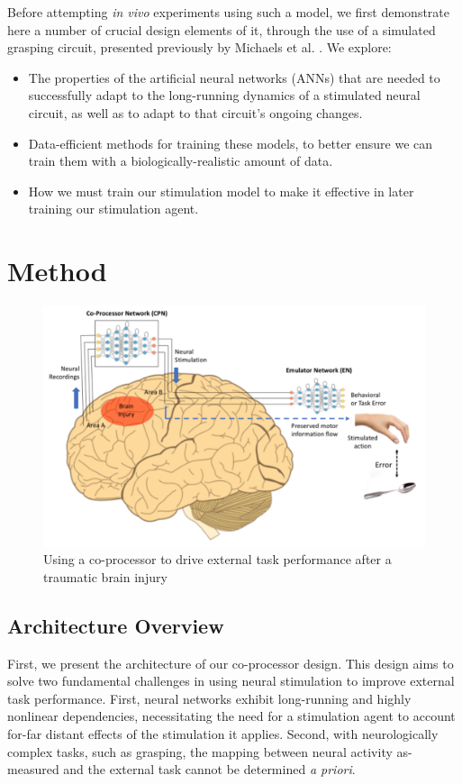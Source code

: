 \documentclass[12pt]{iopart}
\begin{document}
Before attempting \textit{in vivo} experiments using such a model, we first demonstrate
here a number of crucial design elements of it, through the use of a simulated
grasping circuit, presented previously by Michaels et al. \cite{michaels.mrnn}. We
explore:
\begin{itemize}
	\item The properties of the artificial neural networks (ANNs) that are needed to
	      successfully adapt to the long-running dynamics of a stimulated neural circuit,
	      as well as to adapt to that circuit's ongoing changes.
	\item Data-efficient methods for training these models, to better ensure we
	      can train them with a biologically-realistic amount of data.
	\item How we must train our stimulation model to make it effective in later
	      training our stimulation agent.
\end{itemize}

\section{Method}

\begin{figure}
\includegraphics[width=\textwidth]{weill_arch.png}
\caption{Using a co-processor to drive external task performance after a traumatic brain injury}
\centering
\label{fig:weill}
\end{figure}

\subsection{Architecture Overview}
First, we present the architecture of our co-processor design. This design aims to solve two
fundamental challenges in using neural stimulation to improve external task performance.
First, neural networks exhibit long-running and highly nonlinear dependencies, necessitating
the need for a stimulation agent to account for-far distant effects of the stimulation it
applies. Second, with neurologically complex tasks, such as grasping, the mapping between
neural activity as-measured and the external task cannot be determined \textit{a priori}.
\end{document}
